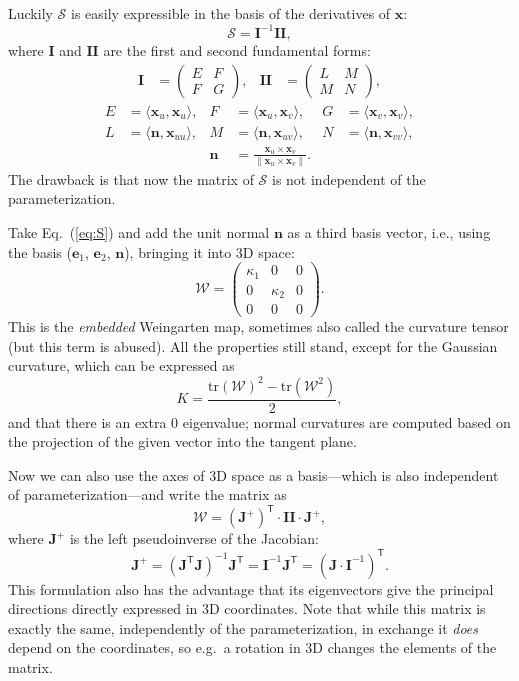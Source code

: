 \documentclass[a4paper]{article}
\begin{document}
Luckily $\mathcal{S}$ is easily expressible in the basis of the derivatives of
$\mathbf{x}$:
\[\mathcal{S}=\mathbf{I}^{-1}\mathbf{I\!I},\]
where $\mathbf{I}$ and $\mathbf{I\!I}$ are the first and second fundamental forms:
\begin{align*}
  \mathbf{I} &= \begin{pmatrix}E&F\\F&G\end{pmatrix}, &
  \mathbf{I\!I} &= \begin{pmatrix}L&M\\M&N\end{pmatrix},
\end{align*}
\begin{align*}
  E &= \langle\mathbf{x}_u,\mathbf{x}_u\rangle, &
  F &= \langle\mathbf{x}_u,\mathbf{x}_v\rangle, &
  G &= \langle\mathbf{x}_v,\mathbf{x}_v\rangle,\\
  L &= \langle\mathbf{n},\mathbf{x}_{uu}\rangle, &
  M &= \langle\mathbf{n},\mathbf{x}_{uv}\rangle, &
  N &= \langle\mathbf{n},\mathbf{x}_{vv}\rangle,\\
  && \mathbf{n} &= \frac{\mathbf{x}_u\times\mathbf{x}_v}{\|{\mathbf{x}_u\times\mathbf{x}_v}\|}. &&
\end{align*}
The drawback is that now the matrix of $\mathcal{S}$ is not independent of the parameterization.

Take Eq.~(\ref{eq:S}) and add the unit normal $\mathbf{n}$ as a
third basis vector, i.e., using the basis ($\mathbf{e}_1$,
$\mathbf{e}_2$, $\mathbf{n}$), bringing it into 3D space:
\[
  \mathcal{W}=
  \begin{pmatrix}
    \kappa_1 & 0 & 0\\
    0 & \kappa_2 & 0\\
    0 & 0 & 0
  \end{pmatrix}.
\]
This is the \emph{embedded} Weingarten map, sometimes also called the
curvature tensor (but this term is abused). All the properties still
stand, except for the Gaussian curvature, which can be expressed as
\[K = \frac{\mathrm{tr}(\mathcal{W})^2-\mathrm{tr}(\mathcal{W}^2)}{2},\]
and that there is an extra $0$ eigenvalue; normal curvatures are
computed based on the projection of the given vector into the tangent plane.

Now we can also use the axes of 3D space as a basis---which is also
independent of parameterization---and write the matrix as
\[\mathcal{W}=(\mathbf{J}^+)^\textsf{T}\cdot\mathbf{I\!I}\cdot\mathbf{J}^+,\]
where $\mathbf{J}^+$ is the left pseudoinverse of the Jacobian:
\[\mathbf{J}^+=
(\mathbf{J}^\textsf{T}\mathbf{J})^{-1}\mathbf{J}^\textsf{T}=
\mathbf{I}^{-1}\mathbf{J}^\textsf{T}=
(\mathbf{J}\cdot\mathbf{I}^{-1})^\textsf{T}.\]
This formulation also has the advantage that its eigenvectors give the
principal directions directly expressed in 3D coordinates. Note that
while this matrix is exactly the same, independently of the
parameterization, in exchange it \emph{does} depend on the
coordinates, so e.g.~a rotation in 3D changes the elements of the
matrix.
\end{document}
